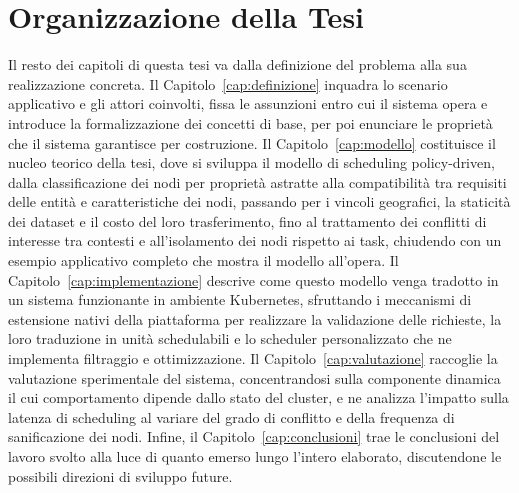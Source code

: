 
\section{Organizzazione della Tesi}
\label{sec:organizzazione}

Il resto dei capitoli di questa tesi va dalla definizione del problema alla sua realizzazione concreta. Il Capitolo~\ref{cap:definizione} inquadra lo scenario applicativo e gli attori coinvolti, fissa le assunzioni entro cui il sistema opera e introduce la formalizzazione dei concetti di base, per poi enunciare le proprietà che il sistema garantisce per costruzione. Il Capitolo~\ref{cap:modello} costituisce il nucleo teorico della tesi, dove si sviluppa il modello di scheduling policy-driven, dalla classificazione dei nodi per proprietà astratte alla compatibilità tra requisiti delle entità e caratteristiche dei nodi, passando per i vincoli geografici, la staticità dei dataset e il costo del loro trasferimento, fino al trattamento dei conflitti di interesse tra contesti e all'isolamento dei nodi rispetto ai task, chiudendo con un esempio applicativo completo che mostra il modello all'opera. Il Capitolo~\ref{cap:implementazione} descrive come questo modello venga tradotto in un sistema funzionante in ambiente Kubernetes, sfruttando i meccanismi di estensione nativi della piattaforma per realizzare la validazione delle richieste, la loro traduzione in unità schedulabili e lo scheduler personalizzato che ne implementa filtraggio e ottimizzazione. Il Capitolo~\ref{cap:valutazione} raccoglie la valutazione sperimentale del sistema, concentrandosi sulla componente dinamica il cui comportamento dipende dallo stato del cluster, e ne analizza l'impatto sulla latenza di scheduling al variare del grado di conflitto e della frequenza di sanificazione dei nodi. Infine, il Capitolo~\ref{cap:conclusioni} trae le conclusioni del lavoro svolto alla luce di quanto emerso lungo l'intero elaborato, discutendone le possibili direzioni di sviluppo future.